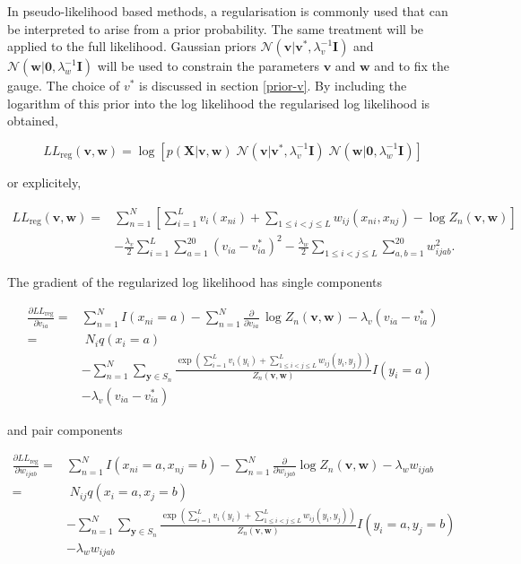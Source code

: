 \documentclass[11pt,a4paper,twoside]{book}
\newcommand{\eq}{\!=\!}
\newcommand{\Gauss}{\mathcal{N}}
\newcommand{\I}{\mathbf{I}}
\newcommand{\LLreg}{L\!L_\mathrm{reg}}
\newcommand{\Sn}{S_n}
\renewcommand{\v}{\mathbf{v}}
\newcommand{\via}{v_{ia}}
\newcommand{\w}{\mathbf{w}}
\newcommand{\wijab}{w_{ijab}}
\newcommand{\X}{\mathbf{X}}
\theoremstyle{definition}
\theoremstyle{definition}
\theoremstyle{remark}
\begin{document}
In pseudo-likelihood based methods, a regularisation is commonly used
that can be interpreted to arise from a prior probability. The same
treatment will be applied to the full likelihood. Gaussian priors
\(\mathcal{N}( \v | \v^*, \lambda_v^{-1} \I)\) and
\(\mathcal{N}( \w |\boldsymbol 0, \lambda_w^{-1} \I)\) will be used to
constrain the parameters \(\v\) and \(\w\) and to fix the gauge. The
choice of \(v^*\) is discussed in section \ref{prior-v}. By including
the logarithm of this prior into the log likelihood the regularised log
likelihood is obtained,

\begin{equation}
    \LLreg(\v,\w)  = \log \left[ p(\X | \v,\w) \;  \Gauss (\v | \v^*, \lambda_v^{-1} \I)  \; \Gauss( \w | \boldsymbol 0, \lambda_w^{-1} \I) \right] 
\end{equation}

or explicitely,

\begin{align}
    \LLreg(\v,\w) =& \sum_{n=1}^N  \left[ \sum_{i=1}^L v_i(x_{ni}) + \sum_{1\le i<j\le L} w_{ij}(x_{ni},x_{nj}) - \log Z_n(\v,\w) \right] \nonumber\\
                    & - \frac{\lambda_v}{2} \!\! \sum_{i=1}^L \sum_{a=1}^{20} (\via - \via^*)^2  - \frac{\lambda_w}{2}  \sum_{1 \le i < j \le L} \sum_{a,b=1}^{20} \wijab^2 .
\end{align}

The gradient of the regularized log likelihood has single components

\begin{align}
    \frac{\partial \LLreg}{\partial \via} =& \sum_{n=1}^N I(x_{ni}=a) - \sum_{n=1}^N \frac{\partial}{\partial \via} \, \log Z_n(\v,\w) - \lambda_v (\via - \via^*) \nonumber\\
                                          =& \; N_i q(x_i \eq a) \nonumber\\
                                          & - \sum_{n=1}^N \sum_{\mathbf{y} \in \Sn} \frac{  \exp \left( \sum_{i=1}^L v_i(y_i) + \sum_{1 \le i<j \le L}^L w_{ij}(y_i,y_j) \right) }{Z_n(\v,\w)}  I(y_i=a) \nonumber\\
                                          & - \lambda_v (\via - \via^*) 
\label{eq:gradient-LLreg-single}
\end{align}

and pair components

\begin{align}
    \frac{\partial \LLreg}{\partial \wijab} =& \sum_{n=1}^N I(x_{ni} \eq a, x_{nj} \eq b) - \sum_{n=1}^N \frac{\partial}{\partial \wijab} \log Z_n(\v,\w)  - \lambda_w \wijab \nonumber\\
                                            =& \; N_{ij} q(x_i \eq a, x_j=b) \nonumber\\
                                            & - \sum_{n=1}^N \sum_{\mathbf{y} \in \Sn} \frac{ \exp \left( \sum_{i=1}^L v_i(y_i) + \sum_{1 \le i<j \le L}^L w_{ij}(y_i,y_j) \right) }{Z_n(\v,\w)} I(y_i \eq a, y_j \eq b) \nonumber\\
                                            & - \lambda_w \wijab  
\label{eq:gradient-LLreg-pair}
\end{align}
\end{document}

